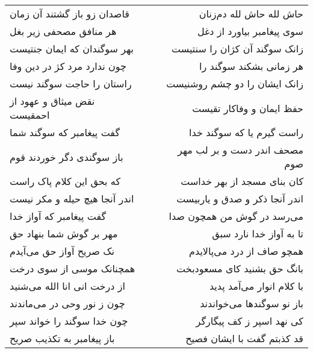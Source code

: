 \begin{center}
\begin{longtable}{l p{0.5cm} r}
قاصدان زو باز گشتند آن زمان
&&
حاش لله حاش لله دم‌زنان
\\
هر منافق مصحفی زیر بغل
&&
سوی پیغامبر بیاورد از دغل
\\
بهر سوگندان که ایمان جنتیست
&&
زانک سوگند آن کژان را سنتیست
\\
چون ندارد مرد کژ در دین وفا
&&
هر زمانی بشکند سوگند را
\\
راستان را حاجت سوگند نیست
&&
زانک ایشان را دو چشم روشنیست
\\
نقض میثاق و عهود از احمقیست
&&
حفظ ایمان و وفاکار تقیست
\\
گفت پیغامبر که سوگند شما
&&
راست گیرم یا که سوگند خدا
\\
باز سوگندی دگر خوردند قوم
&&
مصحف اندر دست و بر لب مهر صوم
\\
که بحق این کلام پاک راست
&&
کان بنای مسجد از بهر خداست
\\
اندر آنجا هیچ حیله و مکر نیست
&&
اندر آنجا ذکر و صدق و یاربیست
\\
گفت پیغامبر که آواز خدا
&&
می‌رسد در گوش من همچون صدا
\\
مهر بر گوش شما بنهاد حق
&&
تا به آواز خدا نارد سبق
\\
نک صریح آواز حق می‌آیدم
&&
همچو صاف از درد می‌پالایدم
\\
همچنانک موسی از سوی درخت
&&
بانگ حق بشنید کای مسعودبخت
\\
از درخت انی انا الله می‌شنید
&&
با کلام انوار می‌آمد پدید
\\
چون ز نور وحی در می‌ماندند
&&
باز نو سوگندها می‌خواندند
\\
چون خدا سوگند را خواند سپر
&&
کی نهد اسپر ز کف پیگارگر
\\
باز پیغامبر به تکذیب صریح
&&
قد کذبتم گفت با ایشان فصیح
\\
\end{longtable}
\end{center}
